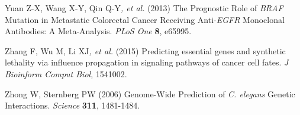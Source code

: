 Yuan Z-X, Wang X-Y, Qin Q-Y\textit{, et al.} (2013) The Prognostic Role
of \textit{BRAF} Mutation in Metastatic Colorectal Cancer Receiving
Anti-\textit{EGFR} Monoclonal Antibodies: A Meta-Analysis. \textit{PLoS
One} \textbf{8}, e65995.



\hypertarget{ENREF117}{}Zhang F, Wu M, Li XJ\textit{, et al.} (2015)
Predicting essential genes and synthetic lethality via influence
propagation in signaling pathways of cancer cell fates. \textit{J
Bioinform Comput Biol}, 1541002.



\hypertarget{ENREF118}{}Zhong W, Sternberg PW (2006) Genome-Wide
Prediction of \textit{C. elegans} Genetic Interactions.
\textit{Science} \textbf{311}, 1481-1484.



%
